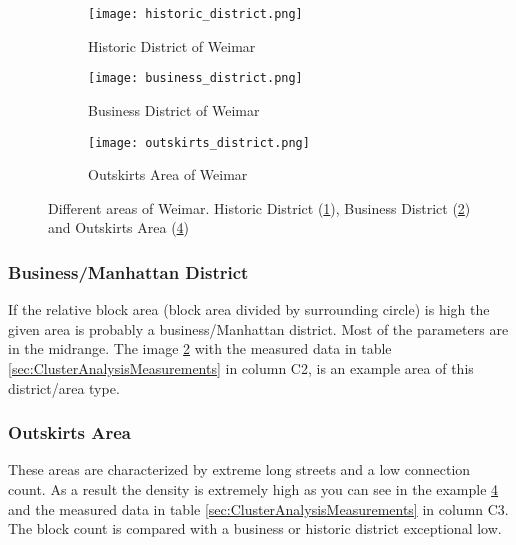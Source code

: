 \begin{figure}
    \centering
    \begin{subfigure}[b]{0.6\textwidth}
        \begin{mdframed}[style=mdthight]
            \texttt{[image: historic\_district.png]}
        \end{mdframed}
        \caption{Historic District of Weimar}
        \label{fig:historic_district}
    \end{subfigure}
    \par\medskip
    \begin{subfigure}[b]{0.6\textwidth}
        \begin{mdframed}[style=mdthight]
            \texttt{[image: business\_district.png]}
        \end{mdframed}
        \caption{Business District of Weimar}
        \label{fig:business_district}
    \end{subfigure}
    \begin{subfigure}[b]{0.6\textwidth}
        \begin{mdframed}[style=mdthight]
            \texttt{[image: outskirts\_district.png]}
        \end{mdframed}
        \caption{Outskirts Area of Weimar}
        \label{fig:outskirts_district}
    \end{subfigure}
    \caption{Different areas of Weimar. Historic District (\ref{fig:historic_district}), Business District (\ref{fig:business_district}) and Outskirts Area (\ref{fig:outskirts_district})}
\end{figure}

\subsubsection{Business/Manhattan District}
\label{sec:businessDistinct}
If the relative block area (block area divided by surrounding circle) is high the given area is probably a business/Manhattan district. Most of the parameters are in the midrange. The image \ref{fig:business_district} with the measured data in table \ref{sec:ClusterAnalysisMeasurements} in column C2, is an example area of this district/area type.

\subsubsection{Outskirts Area}
\label{sec:outskits}
These areas are characterized by extreme long streets and a low connection count. As a result the density is extremely high as you can see in the example \ref{fig:outskirts_district} and the measured data in table \ref{sec:ClusterAnalysisMeasurements} in column C3. The block count is compared with a business or historic district exceptional low.